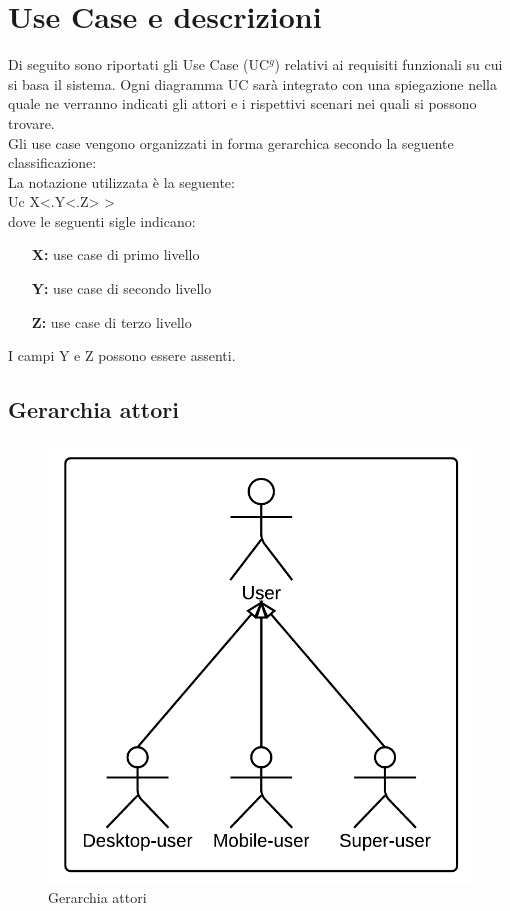 \documentclass[10pt,a4paper]{article}
\begin{document}
\section{Use Case e descrizioni}

\thispagestyle{fancy}

Di seguito sono riportati gli Use Case (UC$^g$) relativi ai requisiti funzionali su cui si basa il sistema. Ogni diagramma UC sarà integrato con una spiegazione nella quale ne verranno indicati gli attori e i rispettivi scenari nei quali si possono trovare.\\
Gli use case vengono organizzati in forma gerarchica secondo la seguente classificazione:\\
La notazione utilizzata è la seguente:\\

Uc X<.Y<.Z> >\\

dove le seguenti sigle indicano:
\begin{itemize}
\item[\textbf{X:}] use case di primo livello
\item[\textbf{Y:}] use case di secondo livello
\item[\textbf{Z:}] use case di terzo livello\\
\end{itemize}
I campi Y e Z possono essere assenti.

\subsection{Gerarchia attori}
\begin{figure}[h]
\centering
\caption{Gerarchia attori}
\includegraphics[scale=0.87]{UseCase/UcUser} %
\end{figure}
\end{document}
